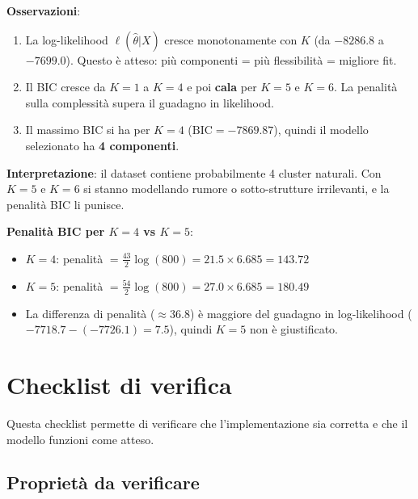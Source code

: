 \documentclass[11pt,a4paper]{article}
\begin{document}
\begin{exbox}
\textbf{Osservazioni}:
\begin{enumerate}[nosep]
  \item La log-likelihood $\ell(\hat\theta|X)$ cresce monotonamente
        con $K$ (da $-8286.8$ a $-7699.0$). Questo è atteso: più
        componenti = più flessibilità = migliore fit.
  \item Il BIC cresce da $K=1$ a $K=4$ e poi \textbf{cala} per $K=5$
        e $K=6$. La penalità sulla complessità supera il guadagno
        in likelihood.
  \item Il massimo BIC si ha per $K=4$ ($\mathrm{BIC}=-7869.87$),
        quindi il modello selezionato ha \textbf{4 componenti}.
\end{enumerate}

\textbf{Interpretazione}: il dataset contiene probabilmente 4 cluster
naturali. Con $K=5$ e $K=6$ si stanno modellando rumore o
sotto-strutture irrilevanti, e la penalità BIC li punisce.

\textbf{Penalità BIC per $K=4$ vs $K=5$}:
\begin{itemize}[nosep]
  \item $K=4$: penalità $= \frac{43}{2}\log(800) = 21.5 \times 6.685
        = 143.72$
  \item $K=5$: penalità $= \frac{54}{2}\log(800) = 27.0 \times 6.685
        = 180.49$
  \item La differenza di penalità ($\approx 36.8$) è maggiore del
        guadagno in log-likelihood ($-7718.7 - (-7726.1) = 7.5$),
        quindi $K=5$ non è giustificato.
\end{itemize}
\end{exbox}

\section{Checklist di verifica}\label{sec:checklist}

Questa checklist permette di verificare che l'implementazione sia
corretta e che il modello funzioni come atteso.

\subsection{Proprietà da verificare}
\end{document}
